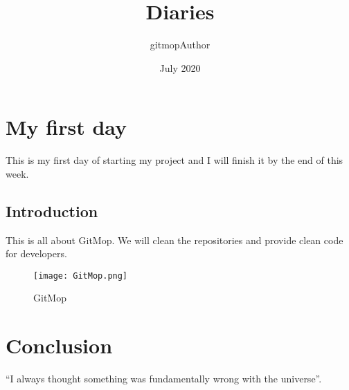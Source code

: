 \documentclass{article}
\title{Diaries}
\author{gitmopAuthor}
\date{July 2020}
\begin{document}
\maketitle

\section{My first day}
This is my first day of starting my project and I will finish it by the end of this week. 

\subsection{Introduction}
This is all about GitMop. We will clean the repositories and provide clean code for developers. 

\begin{figure}[h!]
\centering
\texttt{[image: GitMop.png]}
\caption{GitMop}
\label{fig:universe}
\end{figure}

\section{Conclusion}
``I always thought something was fundamentally wrong with the universe''\cite{adams1995hitchhiker}.



\end{document}
